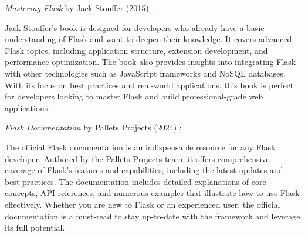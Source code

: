 \textit{Mastering Flask} by Jack Stouffer (2015) \cite{stouffermastering:2015}:

Jack Stouffer's book is designed for developers who already have a basic understanding of Flask and want to deepen their knowledge. It covers advanced Flask topics, including application structure, extension development, and performance optimization. The book also provides insights into integrating Flask with other technologies such as JavaScript frameworks and NoSQL databases. With its focus on best practices and real-world applications, this book is perfect for developers looking to master Flask and build professional-grade web applications.

\textit{Flask Documentation} by Pallets Projects (2024) \cite{Flaskdocs:2024}:

The official Flask documentation is an indispensable resource for any Flask developer. Authored by the Pallets Projects team, it offers comprehensive coverage of Flask's features and capabilities, including the latest updates and best practices. The documentation includes detailed explanations of core concepts, API references, and numerous examples that illustrate how to use Flask effectively. Whether you are new to Flask or an experienced user, the official documentation is a must-read to stay up-to-date with the framework and leverage its full potential.
